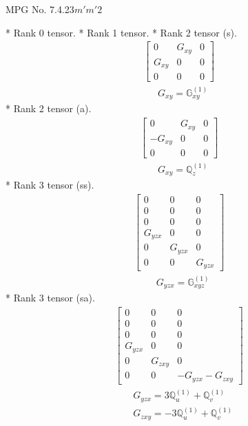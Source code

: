 \documentclass[fleqn,8pt,landscape]{jsarticle}
\begin{document}
\setcounter{MaxMatrixCols}{32}

\renewcommand{\tablename}{Table~}
\renewcommand{\figurename}{Figure~}
\begin{center}
\LARGE
MPG No. 7.4.23\quad$m'm'2$
\end{center}
* Rank 0 tensor.
* Rank 1 tensor.
* Rank 2 tensor (s).
\begin{align*}
\begin{bmatrix} 0 & G_{xy} & 0 \\ G_{xy} & 0 & 0 \\ 0 & 0 & 0 \end{bmatrix}
\end{align*}
\begin{align*}
& G_{xy} = \mathbb{G}_{xy}^{(1)}
\end{align*}
* Rank 2 tensor (a).
\begin{align*}
\begin{bmatrix} 0 & G_{xy} & 0 \\ - G_{xy} & 0 & 0 \\ 0 & 0 & 0 \end{bmatrix}
\end{align*}
\begin{align*}
& G_{xy} = \mathbb{Q}_{z}^{(1)}
\end{align*}
* Rank 3 tensor (ss).
\begin{align*}
\begin{bmatrix} 0 & 0 & 0 \\ 0 & 0 & 0 \\ 0 & 0 & 0 \\ G_{yzx} & 0 & 0 \\ 0 & G_{yzx} & 0 \\ 0 & 0 & G_{yzx} \end{bmatrix}
\end{align*}
\begin{align*}
& G_{yzx} = \mathbb{G}_{xyz}^{(1)}
\end{align*}
* Rank 3 tensor (sa).
\begin{align*}
\begin{bmatrix} 0 & 0 & 0 \\ 0 & 0 & 0 \\ 0 & 0 & 0 \\ G_{yzx} & 0 & 0 \\ 0 & G_{zxy} & 0 \\ 0 & 0 & - G_{yzx} - G_{zxy} \end{bmatrix}
\end{align*}
\begin{align*}
& G_{yzx} = 3 \mathbb{Q}_{u}^{(1)} + \mathbb{Q}_{v}^{(1)} \\
& G_{zxy} = - 3 \mathbb{Q}_{u}^{(1)} + \mathbb{Q}_{v}^{(1)}
\end{align*}
\end{document}
